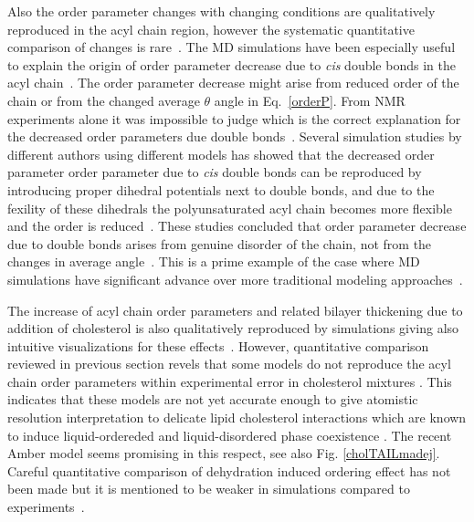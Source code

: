 \documentclass[aps,prl,superscriptaddress,twocolumn]{revtex4}
\begin{document}
Also the order parameter changes with changing conditions are qualitatively reproduced in the acyl chain region, 
however the systematic quantitative comparison of changes is rare~\cite{ollila07a,ferreira13,madej15}.
The MD simulations have been especially useful to explain the origin of order parameter decrease
due to {\it cis} double bonds in the acyl chain~\cite{feller02,huber02,eldho03,stillwell03,gawrisch03,bachar04,ollila07a}. The order parameter decrease might arise
from reduced order of the chain or from the changed average $\theta$ angle in Eq.~\ref{orderP}.
From NMR experiments alone it was impossible to judge which is the correct explanation for
the decreased order parameters due double bonds~\cite{feller02,huber02,eldho03,stillwell03,gawrisch03}. Several simulation studies by different
authors using different models has showed that the decreased order parameter order parameter due to {\it cis} double
bonds can be reproduced by introducing proper dihedral potentials next to double bonds,
and due to the fexility of these dihedrals the polyunsaturated acyl chain becomes more flexible and
the order is reduced~\cite{feller02,eldho03,stillwell03,gawrisch03,bachar04,ollila07a}. 
These studies concluded that order parameter decrease due to double 
bonds arises from genuine disorder of the chain, not from the changes in average angle~\cite{stillwell03,gawrisch03}.
This is a prime example of the case where MD simulations have significant advance over more traditional 
modeling approaches~\cite{stillwell03}.

The increase of acyl chain order parameters and related bilayer thickening due to addition of cholesterol 
is also qualitatively reproduced by simulations giving also intuitive visualizations for these effects~\cite{ferreira13,madej15}. 
However, quantitative comparison reviewed in previous section revels that some models do not reproduce the 
acyl chain order parameters within experimental error in cholesterol mixtures \cite{lim12,ferreira13}.
This indicates that these models are not yet accurate enough to give atomistic resolution interpretation
to delicate lipid cholesterol interactions which are known to induce liquid-ordereded and liquid-disordered
phase coexistence \cite{ipsen87}. The recent Amber model \cite{madej15} seems promising in this respect, see also Fig. \ref{cholTAILmadej}. 
Careful quantitative comparison of dehydration induced ordering effect has not been made but it is mentioned to be 
weaker in simulations compared to experiments~\cite{hogberg06}. 
\end{document}
